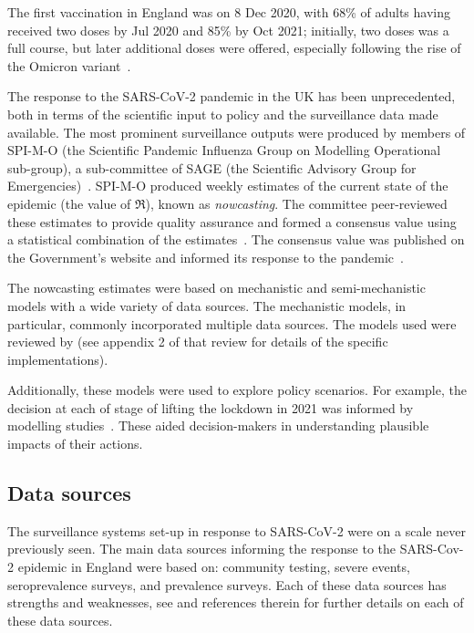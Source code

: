 \documentclass[thesis.tex]{subfiles}
\begin{document}
The first vaccination in England was on 8 Dec 2020, with 68\% of adults having received two doses by Jul 2020 and 85\% by Oct 2021; initially, two doses was a full course, but later additional doses were offered, especially following the rise of the Omicron variant~\autocite{naoCovidVaccination}.

The response to the SARS-CoV-2 pandemic in the UK has been unprecedented, both in terms of the scientific input to policy and the surveillance data made available.
The most prominent surveillance outputs were produced by members of SPI-M-O (the Scientific Pandemic Influenza Group on Modelling Operational sub-group), a sub-committee of SAGE (the Scientific Advisory Group for Emergencies)~\autocite{medleySPIM,govSPIMO}.
SPI-M-O produced weekly estimates of the current state of the epidemic (\eg the value of $\Re$), known as \emph{nowcasting}.
The committee peer-reviewed these estimates to provide quality assurance and formed a consensus value using a statistical combination of the estimates~\autocite{parkCombining}.
The consensus value was published on the Government's website and informed its response to the pandemic~\autocite{govRnumber}.

The nowcasting estimates were based on mechanistic and semi-mechanistic models with a wide variety of data sources.
The mechanistic models, in  particular, commonly incorporated multiple data sources.
The models used were reviewed by \textcite{royalSocietyRnumber} (see appendix 2 of that review for details of the specific implementations).

Additionally, these models were used to explore policy scenarios.
For example, the decision at each of stage of lifting the lockdown in 2021 was informed by modelling studies~\autocite{sageEvidence}.
These aided decision-makers in understanding plausible impacts of their actions.

\subsection{Data sources} \label{intro:sec:data-for-estimating}

The surveillance systems set-up in response to SARS-CoV-2 were on a scale never previously seen.
The main data sources informing the response to the SARS-Cov-2 epidemic in England were based on: community testing, severe events, seroprevalence surveys, and prevalence surveys.
Each of these data sources has strengths and weaknesses, see \textcite{royalSocietyRnumber} and references therein for further details on each of these data sources.
\end{document}
